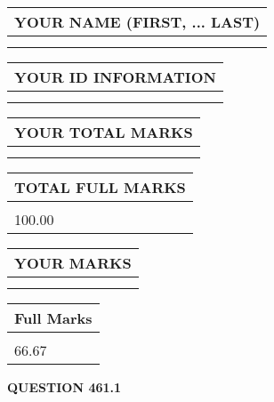 \documentclass{ctexart}
\begin{document}
   
   
   
\newpage 
\setcounter{page}{ 
   461001 } 
   
   
   
   
\noindent\begin{tabular}{|l|}
\hline
YOUR NAME (FIRST, ... LAST)  \\
\hline
 \\ 
 \\ 
\hline
\end{tabular}
\hspace{0.05in} \begin{tabular}{|l|}
\hline
 YOUR   ID   INFORMATION  \\
\hline
 \\ 
 \\ 
\hline
\end{tabular}
   
   
\vspace{0.2in}\noindent\begin{tabular}{|l|}
\hline
YOUR TOTAL MARKS  \\
\hline
 \\ 
 \\ 
\hline
\end{tabular}
\hspace{0.05in} \begin{tabular}{|l|}
\hline
TOTAL FULL MARKS  \\
\hline
 \\ 
100.00 \\
\hline
\end{tabular}
   
   
 \vspace{0.2in}
 
 
 
 
   
   
  
\vspace{0.2in}
  
\noindent\begin{tabular}{|l|}
\hline
 YOUR MARKS  \\
\hline
 \\ 
 \\ 
\hline
\end{tabular}
\hspace{0.05in} \begin{tabular}{|l|}
\hline
 Full Marks  \\
\hline
 \\ 
66.67 \\
\hline
\end{tabular}
{\textbf{\Large{QUESTION
461.1 
}}}
  
\end{document}

